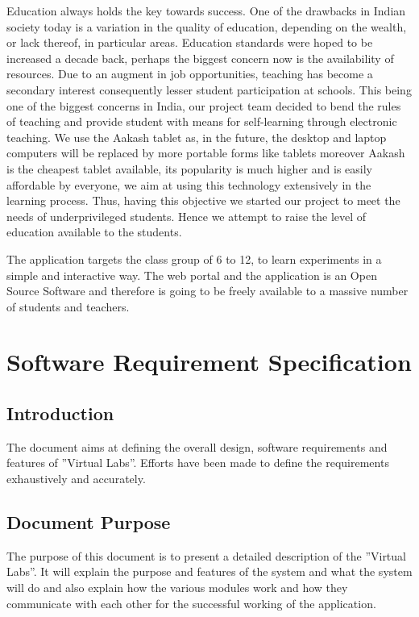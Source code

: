 \documentclass[12pt]{report}
\begin{document}
Education always holds the key towards success. One of the drawbacks in Indian society today is a variation in the quality of education, depending on the wealth, or lack thereof, in particular areas. Education standards were hoped to be increased a decade back, perhaps the biggest concern now is the availability of resources. Due to an augment in job opportunities, teaching has become a secondary interest consequently lesser student participation at schools. This being one of the biggest concerns in India, our project team decided to bend the rules of teaching and provide student with means for self-learning through electronic teaching. We use the Aakash tablet as, in the future, the desktop and laptop computers will be replaced by more portable forms like tablets moreover Aakash is the cheapest tablet available, its popularity is much higher and is easily affordable by everyone, we aim at using this technology extensively in the learning process. Thus, having this objective we started our project to meet the needs of underprivileged students. Hence we attempt to raise the level of education available to the students.\newline

The application targets the class group of 6 to 12, to learn experiments in a simple and interactive way. The web portal and the application is an Open Source Software and therefore is going to be freely available to a massive number of students and teachers.

\pagebreak \thispagestyle{empty} \pagebreak
\listoffigures
\listoftables
\tableofcontents

\pagebreak
\cleardoublepage

\setcounter{page}{1}

\chapter{Software Requirement Specification}

\section{Introduction}
The document aims at defining the overall design, software requirements and features of ''Virtual Labs''. Efforts have been made to define the requirements exhaustively and accurately. 

\section{Document Purpose}
The purpose of this document is to present a detailed description of the ''Virtual Labs''. It will explain the purpose and features of the system and what the system will do and also explain how the various modules work and how they communicate with each other for the successful working of the application.
\end{document}
